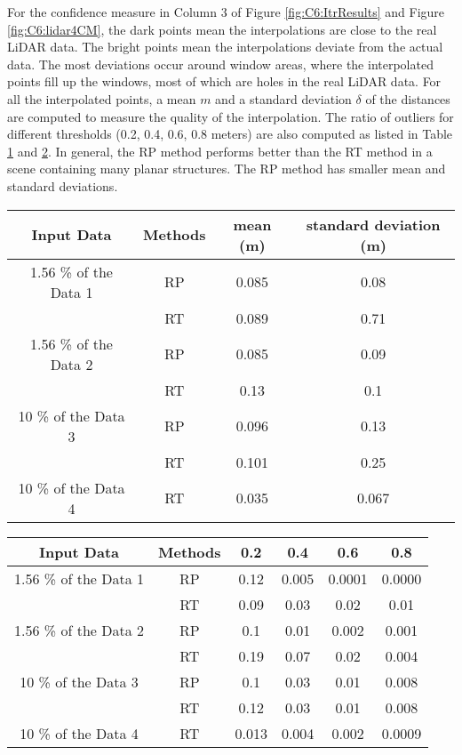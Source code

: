 For the confidence measure in Column 3 of Figure \ref{fig:C6:ItrResults} and Figure \ref{fig:C6:lidar4CM}, the dark points mean the interpolations are close to the real LiDAR data. The bright points mean the interpolations deviate from the actual data. The most deviations occur around window areas, where the interpolated points fill up the windows, most of which are holes in the real LiDAR data. For all the interpolated points, a mean $m$ and a standard deviation $\delta$ of the distances are computed to measure the quality of the interpolation. The ratio of outliers for different thresholds (0.2, 0.4, 0.6, 0.8 meters) are also computed as listed in Table  \ref{table:C5:tableMS} and \ref{table:C5:tableOutliers}. In general, the RP method performs better than the RT method in a scene containing many planar structures. The RP method has smaller mean and standard deviations.  

\begin{table}
\centering
{}
\begin{tabular}{|c| c| c|c|}
\hline
Input Data & Methods & mean (m) & standard deviation (m) \\
\hline
1.56 \% of the Data 1 &  RP & 0.085 & 0.08\\
                                &  RT & 0.089 & 0.71 \\  \cline{1-4}
1.56 \% of the Data 2 &  RP & 0.085 & 0.09\\
                                &  RT & 0.13 & 0.1 \\  \cline{1-4}
10 \% of the Data 3    &  RP & 0.096 & 0.13\\
                                &  RT & 0.101 & 0.25 \\  \cline{1-4}
10 \% of the Data 4    & RT  & 0.035 & 0.067 \\  
\hline
\end{tabular}
\label{table:C5:tableMS}
\end{table}

\begin{table}
\centering
{}
\begin{tabular}{|c|c| c| c|c|c|}
\hline
Input Data & Methods & 0.2 & 0.4 & 0.6 & 0.8 \\
\hline
1.56 \% of the Data 1 &  RP & 0.12 & 0.005 &0.0001 &0.0000 \\
                                &  RT & 0.09 & 0.03 &0.02 &0.01 \\  \cline{1-6}
1.56 \% of the Data 2 &  RP &0.1 & 0.01 &0.002 &0.001\\
                                &  RT & 0.19 & 0.07 &0.02 &0.004 \\  \cline{1-6}
10 \% of the Data 3    &  RP & 0.1 & 0.03 &0.01 &0.008\\
                                &  RT & 0.12 & 0.03 &0.01 &0.008 \\  \cline{1-6}
10 \% of the Data 4    &  RT &  0.013 & 0.004 &0.002 &0.0009 \\ 
\hline
\end{tabular}
\label{table:C5:tableOutliers}
\end{table}

